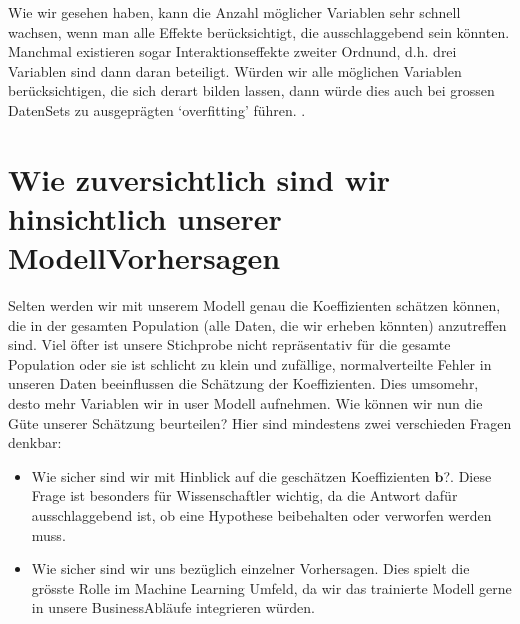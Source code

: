 \documentclass[letterpaper,10pt,english]{jupyterBook}
\begin{document}
\sphinxAtStartPar
Wie wir gesehen haben, kann die Anzahl möglicher Variablen sehr schnell wachsen, wenn man alle Effekte berücksichtigt, die ausschlaggebend sein könnten. Manchmal existieren sogar Interaktionseffekte zweiter Ordnund, d.h. drei Variablen sind dann daran beteiligt. 
Würden wir alle möglichen Variablen berücksichtigen, die sich derart bilden lassen, dann würde dies auch bei grossen Daten\sphinxhyphen{}Sets zu ausgeprägten ‘overfitting’ führen. .


\chapter{Wie zuversichtlich sind wir hinsichtlich unserer Modell\sphinxhyphen{}Vorhersagen}
\label{\detokenize{Regression_Techniques:wie-zuversichtlich-sind-wir-hinsichtlich-unserer-modell-vorhersagen}}
\sphinxAtStartPar
Selten werden wir mit unserem Modell genau die Koeffizienten schätzen können, die in der gesamten Population (alle Daten, die wir erheben könnten) anzutreffen sind. Viel öfter ist unsere Stichprobe nicht repräsentativ für die gesamte Population oder sie ist schlicht zu klein und zufällige, normalverteilte Fehler in unseren Daten beeinflussen die Schätzung der Koeffizienten. Dies umsomehr, desto mehr Variablen wir in user Modell aufnehmen.
Wie können wir nun die Güte unserer Schätzung beurteilen? Hier sind mindestens zwei verschieden Fragen denkbar:
\begin{itemize}
\item {} 
\sphinxAtStartPar
Wie sicher sind wir mit Hinblick auf die geschätzen Koeffizienten \(\mathbf{b}\)?. Diese Frage ist besonders für Wissenschaftler wichtig, da die Antwort dafür ausschlaggebend ist, ob eine Hypothese beibehalten oder verworfen werden muss.

\item {} 
\sphinxAtStartPar
Wie sicher sind wir uns bezüglich einzelner Vorhersagen. Dies spielt die grösste Rolle im Machine Learning Umfeld, da wir das trainierte Modell gerne in unsere Business\sphinxhyphen{}Abläufe integrieren würden.

\end{itemize}
\end{document}
